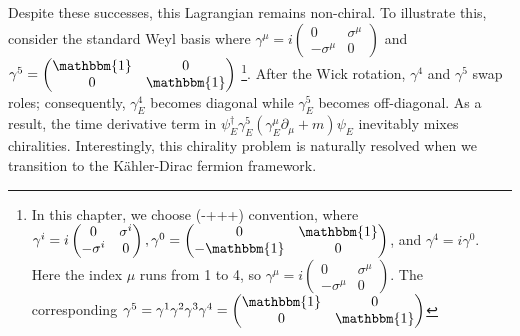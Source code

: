 
Despite these successes, this Lagrangian remains non-chiral. To illustrate this, consider the standard Weyl basis where $\gamma^\mu=i\begin{pmatrix}0& \sigma^\mu\\ -\sigma^\mu & 0\end{pmatrix}$ and $\gamma^5=\begin{pmatrix}\mathbbm{1}& 0\\ 0 & \mathbbm{1}\end{pmatrix}$ \footnote{In this chapter, we choose (-+++) convention, where $\gamma^i=i\begin{pmatrix}0& \sigma^i\\ -\sigma^i & 0\end{pmatrix}, \gamma^0=\begin{pmatrix}0& \mathbbm{1}\\ -\mathbbm{1} & 0\end{pmatrix}$, and $\gamma^4=i\gamma^0$. Here the index $\mu$ runs from 1 to 4, so $\gamma^\mu=i\begin{pmatrix}0& \sigma^\mu\\ -\sigma^\mu & 0\end{pmatrix}$. The corresponding $\gamma^5=\gamma^1\gamma^2\gamma^3\gamma^4=\begin{pmatrix}\mathbbm{1}& 0\\ 0 & \mathbbm{1}\end{pmatrix}$}. After the Wick rotation, $\gamma^4$ and $\gamma^5$ swap roles; consequently, $\gamma^4_E$ becomes diagonal while $\gamma_E^5$ becomes off-diagonal. As a result, the time derivative term in $\psi_E^\dagger \gamma_E^5(\gamma_E^\mu\partial_\mu +m)\psi_E$ inevitably mixes chiralities. Interestingly, this chirality problem is naturally resolved when we transition to the Kähler-Dirac fermion framework.


